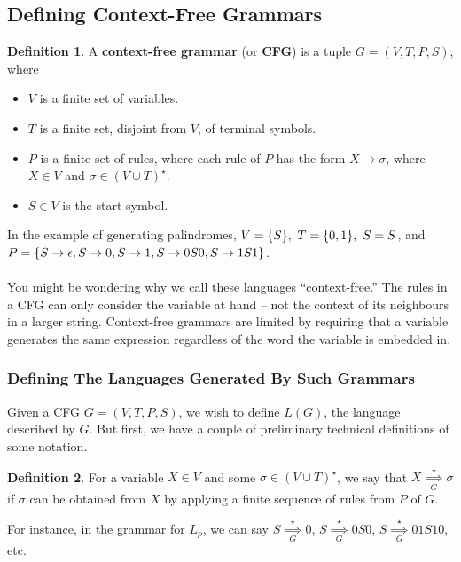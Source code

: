 \documentclass[]{article}
\DeclarePairedDelimiter{\set}{\lbrace}{\rbrace}
\theoremstyle{definition}
\newtheorem*{defn}{Definition}
\begin{document}
    \subsection{Defining Context-Free Grammars}
      \begin{defn}
        A \textbf{context-free grammar} (or \textbf{CFG}) is a tuple $G = (V, T, P, S)$, where
        \begin{itemize}
          \item $V$ is a finite set of variables.
          \item $T$ is a finite set, disjoint from $V$, of terminal symbols.
          \item $P$ is a finite set of rules, where each rule of $P$ has the form $X \to \sigma$, where $X \in V$ and $\sigma \in (V \cup T)^\star$.
          \item $S \in V$ is the start symbol.
        \end{itemize}
      \end{defn}

      In the example of generating palindromes, $V = \set{S},~ T = \set{0, 1},~ S = S$, and $P = \set{S \to \epsilon, S \to 0, S \to 1, S \to 0S0, S \to 1S1 }$.
      \\ \\
      You might be wondering why we call these languages ``context-free.'' The rules in a CFG can only consider the variable at hand -- not the context of its neighbours in a larger string. Context-free grammars are limited by requiring that a variable generates the same expression regardless of the word the variable is embedded in.

      \subsubsection{Defining The Languages Generated By Such Grammars}
        Given a CFG $G = (V, T, P, S)$, we wish to define $L(G)$, the language described by $G$. But first, we have a couple of preliminary technical definitions of some notation.

        \begin{defn}
          For a variable $X \in V$ and some $\sigma \in (V \cup T)^\star$, we say that $X \underset{G}{\overset{\star}{\implies}} \sigma$ if $\sigma$ can be obtained from $X$ by applying a finite sequence of rules from $P$ of $G$.
        \end{defn}

        For instance, in the grammar for $L_p$, we can say $S \underset{G}{\overset{\star}{\implies}} 0$, $S \underset{G}{\overset{\star}{\implies}} 0S0$, $S \underset{G}{\overset{\star}{\implies}} 01S10$, etc.
\end{document}
